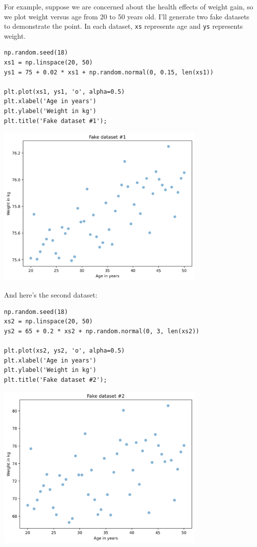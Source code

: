 For example, suppose we are concerned about the health effects of weight
gain, so we plot weight versus age from 20 to 50 years old. I'll
generate two fake datasets to demonstrate the point. In each dataset,
\passthrough{\lstinline!xs!} represents age and
\passthrough{\lstinline!ys!} represents weight.

\begin{lstlisting}[]
np.random.seed(18)
xs1 = np.linspace(20, 50)
ys1 = 75 + 0.02 * xs1 + np.random.normal(0, 0.15, len(xs1))

plt.plot(xs1, ys1, 'o', alpha=0.5)
plt.xlabel('Age in years')
plt.ylabel('Weight in kg')
plt.title('Fake dataset #1');
\end{lstlisting}

\begin{center}
\includegraphics[width=4in]{chapters/09_relationships_files/09_relationships_66_0.png}
\end{center}

And here's the second dataset:

\begin{lstlisting}[]
np.random.seed(18)
xs2 = np.linspace(20, 50)
ys2 = 65 + 0.2 * xs2 + np.random.normal(0, 3, len(xs2))

plt.plot(xs2, ys2, 'o', alpha=0.5)
plt.xlabel('Age in years')
plt.ylabel('Weight in kg')
plt.title('Fake dataset #2');
\end{lstlisting}

\begin{center}
\includegraphics[width=4in]{chapters/09_relationships_files/09_relationships_68_0.png}
\end{center}

